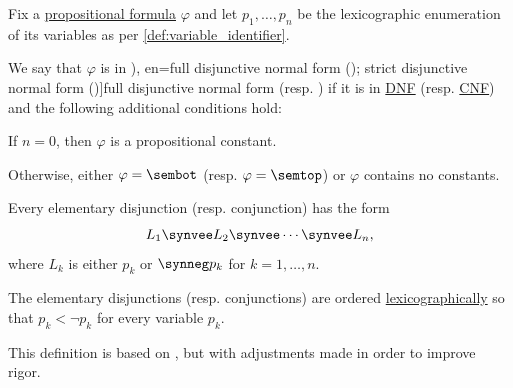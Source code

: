 \begin{definition}\label{def:full_propositional_cnf_and_dnf}\mimprovised
  Fix a \hyperref[def:propositional_formula]{propositional formula} \( \varphi \) and let \( p_1, \ldots, p_n \) be the lexicographic enumeration of its variables as per \cref{def:variable_identifier}.

  We say that \( \varphi \) is in \term[ru=совершенная дизъюнктная нормальная форма (\cite[def. 6.3; def. 6.4]{Эдельман1975Логика}), en=full disjunctive normal form (\cite[103]{DaveyPriestley2002LatticeTheory}); strict disjunctive normal form (\cite[def. 1.3.10]{Hinman2005Logic})]{full disjunctive normal form} (resp. ) if it is in \hyperref[def:propositional_cnf_and_dnf]{DNF} (resp. \hyperref[def:propositional_cnf_and_dnf]{CNF}) and the following additional conditions hold:
  \begin{thmenum}
     If \( n = 0 \), then \( \varphi \) is a propositional constant.

    Otherwise, either \( \varphi = \sembot \) (resp. \( \varphi = \semtop \)) or \( \varphi \) contains no constants.

     Every elementary disjunction (resp. conjunction) has the form
    \begin{equation*}
      L_1 \synvee L_2 \synvee \cdots \synvee L_n,
    \end{equation*}
    where \( L_k \) is either \( p_k \) or \( \synneg p_k \) for \( k = 1, \ldots, n \).

     The elementary disjunctions (resp. conjunctions) are ordered \hyperref[def:lexicographic_order]{lexicographically} so that \( p_k < \neg p_k \) for every variable \( p_k \).
  \end{thmenum}
\end{definition}
\begin{comments}
  \item This definition is based on \cite[def. 6.3; def. 6.4]{Эдельман1975Логика}, but with adjustments made in order to improve rigor.
\end{comments}

